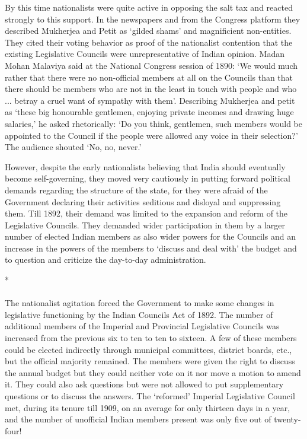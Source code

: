 \begin{multicols}{2}
By this time nationalists were quite active in opposing the salt tax and reacted strongly to this support. In the newspapers and from the Congress platform they described Mukherjea and Petit as `gilded shams' and magnificient non-entities. They cited their voting behavior as proof of the nationalist contention that the existing Legislative Councils were unrepresentative of Indian opinion. Madan Mohan Malaviya said at the National Congress session of 1890: `We would much rather that there were no non-official members at all on the Councils than that there should be members who are not in the least in touch with people and who ... betray a cruel want of sympathy with them'. Describing Mukherjea and petit as `these big honourable gentlemen, enjoying private incomes and drawing huge salaries,' he asked rhetorically: `Do you think, gentlemen, such members would be appointed to the Council if the people were allowed any voice in their selection?' The audience shouted `No, no, never.'

However, despite the early nationalists believing that India should eventually become self-governing, they moved very cautiously in putting forward political demands regarding the structure of the state, for they were afraid of the Government declaring their activities seditious and disloyal and suppressing them. Till 1892, their demand was limited to the expansion and reform of the Legislative Councils. They demanded wider participation in them by a larger number of elected Indian members as also wider powers for the Councils and an increase in the powers of the members to `discuss and deal with' the budget and to question and criticize the day-to-day administration.

\begin{center}*\end{center}

\paragraph*{}

The nationalist agitation forced the Government to make some changes in legislative functioning by the Indian Councils Act of 1892. The number of additional members of the Imperial and Provincial Legislative Councils was increased from the previous six to ten to ten to sixteen. A few of these members could be elected indirectly through municipal committees, district boards, etc., but the official majority remained. The members were given the right to discuss the annual budget but they could neither vote on it nor move a motion to amend it. They could also ask questions but were not allowed to put supplementary questions or to discuss the answers. The `reformed' Imperial Legislative Council met, during its tenure till 1909, on an average for only thirteen days in a year, and the number of unofficial Indian members present was only five out of twenty- four!


\end{multicols}
